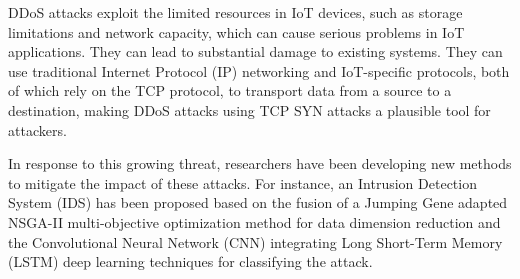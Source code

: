 DDoS attacks exploit the limited resources in IoT devices, such as storage limitations and network capacity, which can cause serious problems in IoT applications. They can lead to substantial damage to existing systems\cite{al2021ddos}. They can use traditional Internet Protocol (IP) networking and IoT-specific protocols, both of which rely on the TCP protocol, to transport data from a source to a destination, making DDoS attacks using TCP SYN attacks a plausible tool for attackers\cite{machaka2021modelling}.

In response to this growing threat, researchers have been developing new methods to mitigate the impact of these attacks. For instance, an Intrusion Detection System (IDS) has been proposed based on the fusion of a Jumping Gene adapted NSGA-II multi-objective optimization method for data dimension reduction and the Convolutional Neural Network (CNN) integrating Long Short-Term Memory (LSTM) deep learning techniques for classifying the attack\cite{roopak2020intrusion}.
